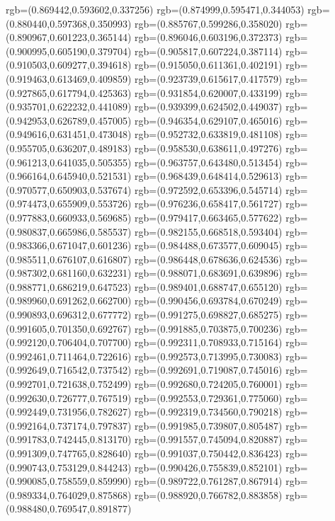 {{{			rgb=(0.869442,0.593602,0.337256)
			rgb=(0.874999,0.595471,0.344053)
			rgb=(0.880440,0.597368,0.350993)
			rgb=(0.885767,0.599286,0.358020)
			rgb=(0.890967,0.601223,0.365144)
			rgb=(0.896046,0.603196,0.372373)
			rgb=(0.900995,0.605190,0.379704)
			rgb=(0.905817,0.607224,0.387114)
			rgb=(0.910503,0.609277,0.394618)
			rgb=(0.915050,0.611361,0.402191)
			rgb=(0.919463,0.613469,0.409859)
			rgb=(0.923739,0.615617,0.417579)
			rgb=(0.927865,0.617794,0.425363)
			rgb=(0.931854,0.620007,0.433199)
			rgb=(0.935701,0.622232,0.441089)
			rgb=(0.939399,0.624502,0.449037)
			rgb=(0.942953,0.626789,0.457005)
			rgb=(0.946354,0.629107,0.465016)
			rgb=(0.949616,0.631451,0.473048)
			rgb=(0.952732,0.633819,0.481108)
			rgb=(0.955705,0.636207,0.489183)
			rgb=(0.958530,0.638611,0.497276)
			rgb=(0.961213,0.641035,0.505355)
			rgb=(0.963757,0.643480,0.513454)
			rgb=(0.966164,0.645940,0.521531)
			rgb=(0.968439,0.648414,0.529613)
			rgb=(0.970577,0.650903,0.537674)
			rgb=(0.972592,0.653396,0.545714)
			rgb=(0.974473,0.655909,0.553726)
			rgb=(0.976236,0.658417,0.561727)
			rgb=(0.977883,0.660933,0.569685)
			rgb=(0.979417,0.663465,0.577622)
			rgb=(0.980837,0.665986,0.585537)
			rgb=(0.982155,0.668518,0.593404)
			rgb=(0.983366,0.671047,0.601236)
			rgb=(0.984488,0.673577,0.609045)
			rgb=(0.985511,0.676107,0.616807)
			rgb=(0.986448,0.678636,0.624536)
			rgb=(0.987302,0.681160,0.632231)
			rgb=(0.988071,0.683691,0.639896)
			rgb=(0.988771,0.686219,0.647523)
			rgb=(0.989401,0.688747,0.655120)
			rgb=(0.989960,0.691262,0.662700)
			rgb=(0.990456,0.693784,0.670249)
			rgb=(0.990893,0.696312,0.677772)
			rgb=(0.991275,0.698827,0.685275)
			rgb=(0.991605,0.701350,0.692767)
			rgb=(0.991885,0.703875,0.700236)
			rgb=(0.992120,0.706404,0.707700)
			rgb=(0.992311,0.708933,0.715164)
			rgb=(0.992461,0.711464,0.722616)
			rgb=(0.992573,0.713995,0.730083)
			rgb=(0.992649,0.716542,0.737542)
			rgb=(0.992691,0.719087,0.745016)
			rgb=(0.992701,0.721638,0.752499)
			rgb=(0.992680,0.724205,0.760001)
			rgb=(0.992630,0.726777,0.767519)
			rgb=(0.992553,0.729361,0.775060)
			rgb=(0.992449,0.731956,0.782627)
			rgb=(0.992319,0.734560,0.790218)
			rgb=(0.992164,0.737174,0.797837)
			rgb=(0.991985,0.739807,0.805487)
			rgb=(0.991783,0.742445,0.813170)
			rgb=(0.991557,0.745094,0.820887)
			rgb=(0.991309,0.747765,0.828640)
			rgb=(0.991037,0.750442,0.836423)
			rgb=(0.990743,0.753129,0.844243)
			rgb=(0.990426,0.755839,0.852101)
			rgb=(0.990085,0.758559,0.859990)
			rgb=(0.989722,0.761287,0.867914)
			rgb=(0.989334,0.764029,0.875868)
			rgb=(0.988920,0.766782,0.883858)
			rgb=(0.988480,0.769547,0.891877)
}}}

